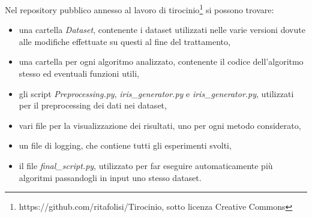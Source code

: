 \documentclass[oneside, openany]{book}
\begin{document}
	Nel repository pubblico annesso al lavoro di tirocinio\footnote{https://github.com/ritafolisi/Tirocinio, sotto licenza Creative Commons} si possono trovare:
	\begin{itemize}
		\item una cartella \textit{Dataset}, contenente i dataset utilizzati nelle varie versioni dovute alle modifiche effettuate su questi al fine del trattamento,
		\item una cartella per ogni algoritmo analizzato, contenente il codice dell'algoritmo stesso ed eventuali funzioni utili,
		\item gli script \textit{Preprocessing.py}, \textit{iris\_generator.py} e \textit{iris\_generator.py}, utilizzati per il preprocessing dei dati nei dataset,
		\item vari file per la visualizzazione dei risultati, uno per ogni metodo considerato,
		\item un file di logging, che contiene tutti gli esperimenti svolti,
		\item il file \textit{final\_script.py}, utilizzato per far eseguire automaticamente più algoritmi passandogli in input uno stesso dataset. 
	\end{itemize}
	
\end{document}
